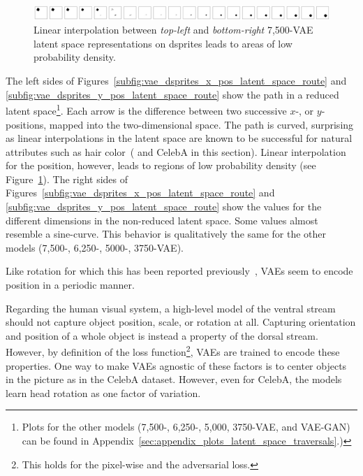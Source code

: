 \begin{figure}
    \centering
    \includegraphics[width=\textwidth]{images/latent_space_traversals/vae_dsprites_7500_position.png}
    \caption{Linear interpolation between \textit{top-left} and \textit{bottom-right} 7,500-VAE latent space representations on dsprites leads to areas of low probability density.}
    \label{fig:vae_7500_dsprites_position_interpolation}
\end{figure}

The left sides of Figures~\ref{subfig:vae_dsprites_x_pos_latent_space_route} and \ref{subfig:vae_dsprites_y_pos_latent_space_route} show the path in a reduced latent space\footnote{Plots for the other models (7,500-, 6,250-, 5,000, 3750-\ac{VAE}, and \ac{VAE}-\ac{GAN}) can be found in Appendix~\ref{sec:appendix_plots_latent_space_traversals}.)}.
Each arrow is the difference between two successive $x$-, or $y$-positions, mapped into the two-dimensional space.
The path is curved, surprising as linear interpolations in the latent space are known to be successful for natural attributes such as hair color~(\citep{radford2016deep} and CelebA in this section).
Linear interpolation for the position, however, leads to regions of low probability density (see Figure~\ref{fig:vae_7500_dsprites_position_interpolation}).
The right sides of Figures~\ref{subfig:vae_dsprites_x_pos_latent_space_route} and \ref{subfig:vae_dsprites_y_pos_latent_space_route} show the values for the different dimensions in the non-reduced latent space.
Some values almost resemble a sine-curve.
This behavior is qualitatively the same for the other models (7,500-, 6,250-, 5000-, 3750-\ac{VAE}).

Like rotation for which this has been reported previously~\citep{chen2018isolating}, \acp{VAE} seem to encode position in a periodic manner.

Regarding the human visual system, a high-level model of the ventral stream should not capture object position, scale, or rotation at all.
Capturing orientation and position of a whole object is instead a property of the dorsal stream.
However, by definition of the loss function\footnote{This holds for the pixel-wise and the adversarial loss.}, \acp{VAE} are trained to encode these properties.
One way to make \acp{VAE} agnostic of these factors is to center objects in the picture as in the CelebA dataset.
However, even for CelebA, the models learn head rotation as one factor of variation.

